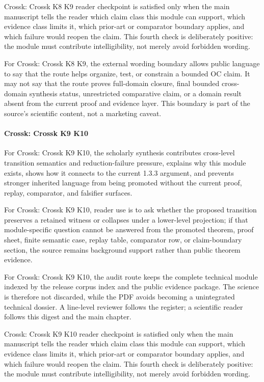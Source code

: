 Crossk: Crossk K8 K9 reader checkpoint is satisfied only when the main manuscript tells the reader which claim class this module can support, which evidence class limits it, which prior-art or comparator boundary applies, and which failure would reopen the claim. This fourth check is deliberately positive: the module must contribute intelligibility, not merely avoid forbidden wording.


For Crossk: Crossk K8 K9, the external wording boundary allows public language to say that the route helps organize, test, or constrain a bounded OC claim. It may not say that the route proves full-domain closure, final bounded cross-domain synthesis status, unrestricted comparative claim, or a domain result absent from the current proof and evidence layer. This boundary is part of the source's scientific content, not a marketing caveat.


\paragraph{Crossk: Crossk K9 K10}

For Crossk: Crossk K9 K10, the scholarly synthesis contributes cross-level transition semantics and reduction-failure pressure, explains why this module exists, shows how it connects to the current 1.3.3 argument, and prevents stronger inherited language from being promoted without the current proof, replay, comparator, and falsifier surfaces.


For Crossk: Crossk K9 K10, reader use is to ask whether the proposed transition preserves a retained witness or collapses under a lower-level projection; if that module-specific question cannot be answered from the promoted theorem, proof sheet, finite semantic case, replay table, comparator row, or claim-boundary section, the source remains background support rather than public theorem evidence.


For Crossk: Crossk K9 K10, the audit route keeps the complete technical module indexed by the release corpus index and the public evidence package. The science is therefore not discarded, while the PDF avoids becoming a unintegrated technical dossier. A line-level reviewer follows the register; a scientific reader follows this digest and the main chapter.


Crossk: Crossk K9 K10 reader checkpoint is satisfied only when the main manuscript tells the reader which claim class this module can support, which evidence class limits it, which prior-art or comparator boundary applies, and which failure would reopen the claim. This fourth check is deliberately positive: the module must contribute intelligibility, not merely avoid forbidden wording.


